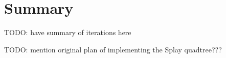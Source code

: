 \section{Summary}

TODO: have summary of iterations here

TODO: mention original plan of implementing the Splay quadtree???